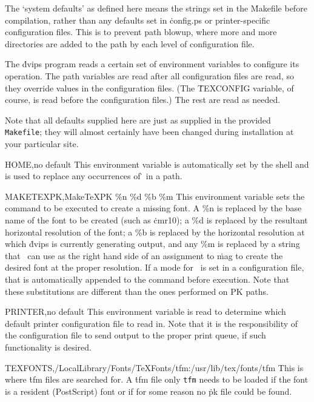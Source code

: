 The `system defaults' as defined here means the strings set in the
\.{Makefile} before compilation, rather than any defaults set in
\.{config.ps} or printer-specific configuration files.  This is to
prevent path blowup, where more and more directories are added to the
path by each level of configuration file.


The \.{dvips} program reads a certain set of environment variables to
configure its operation.  The path variables are read after all
configuration files are read, so they override values in the configuration
files.  (The \.{TEXCONFIG} variable, of course, is read before the
configuration files.)  The rest are read as needed.

Note that all defaults supplied here are just as supplied in the
provided {\tt Makefile}; they will almost certainly have been changed
during installation at your particular site.

\descenv HOME,{\rm no default}
  This environment variable is automatically set by the shell and is
used to replace any occurrences of \.{\tilde} in a path.

\descenv MAKETEXPK,{MakeTeXPK \%n \%d \%b \%m}
This environment variable sets the command to be executed to create
a missing font.  A \%n is replaced by the base name of the font to
be created (such as \.{cmr10}); a \%d is replaced by the resultant
horizontal resolution of the font; a \%b is replaced by the
horizontal resolution at which \.{dvips} is currently generating
output, and any \%m is replaced by a string that \MF\ can use as
the right hand side of an assignment to \.{mag} to create the
desired font at the proper resolution.  If a mode for \MF\ is set in
a configuration file, that is automatically appended to the command
before execution.  Note that these substitutions are different than
the ones performed on PK paths.

\descenv PRINTER,{\rm no default}
  This environment variable is read to determine which default printer
configuration file to read in.  Note that it is the responsibility of
the configuration file to send output to the proper print queue, if such
functionality is desired.

\descenv TEXFONTS,{/LocalLibrary/Fonts/TeXFonts/tfm:/usr/lib/tex/fonts/tfm}
  This is where \.{tfm} files are searched for.  A \.{tfm} file only
\^{{\tt tfm}}
needs to be loaded if the font is a resident (PostScript) font or if
for some reason no \.{pk} file could be found.

